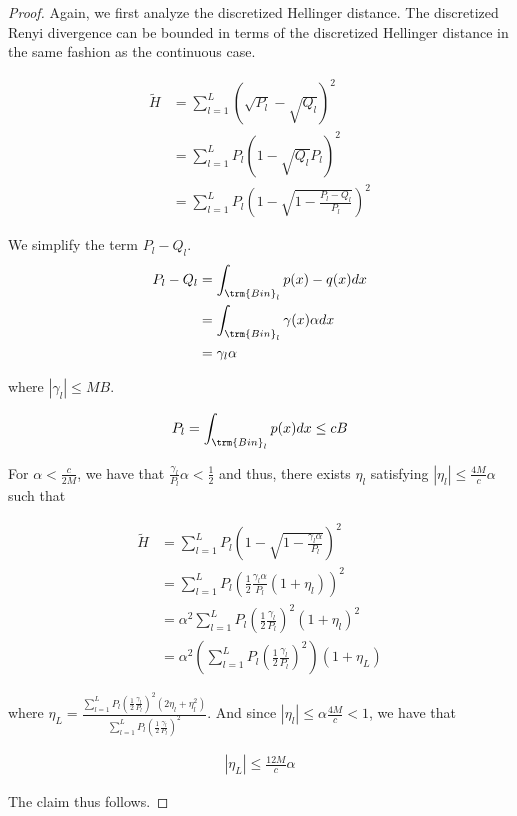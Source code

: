 \documentclass{article}
\begin{document}
\begin{proof}

Again, we first analyze the discretized Hellinger distance. The discretized Renyi divergence can be bounded in terms of the discretized Hellinger distance in the same fashion as the continuous case. 

\begin{align*}
\tilde{H} &= \sum_{l=1}^L (\sqrt{P_l} - \sqrt{Q_l})^2 \\
   &= \sum_{l=1}^L P_l \left( 1 - \sqrt{Q_l}{P_l} \right)^2 \\
 &= \sum_{l=1}^L P_l \left( 1 - \sqrt{1 - \frac{P_l - Q_l}{P_l}} \right)^2 
\end{align*}

We simplify the term $P_l - Q_l$.
\begin{align*}
P_l - Q_l &= \int_{\trm{Bin}_l} p(x) - q(x) dx \\
  &= \int_{\trm{Bin}_l} \gamma(x) \alpha dx \\
  &= \gamma_l \alpha 
\end{align*}

where $|\gamma_l| \leq M B$. 

\[
P_l = \int_{\trm{Bin}_l} p(x) dx \leq c B
\]

For $\alpha < \frac{c}{2M}$, we have that $\frac{\gamma_l}{P_l} \alpha < \frac{1}{2}$ and thus, there exists $\eta_l$ satisfying $|\eta_l| \leq \frac{4M}{c} \alpha$ such that

\begin{align*}
\tilde{H} &= \sum_{l=1}^L P_l \left( 1 - \sqrt{ 1 - \frac{\gamma_l \alpha}{P_l}} \right)^2
\\
&= \sum_{l=1}^L P_l \left( \frac{1}{2} \frac{\gamma_l \alpha}{P_l} (1 + \eta_l) \right)^2 \\
&= \alpha^2 \sum_{l=1}^L P_l \left( \frac{1}{2} \frac{\gamma_l}{P_l} \right)^2 (1 + \eta_l)^2 \\
&= \alpha^2 \left( \sum_{l=1}^L P_l \left( \frac{1}{2} \frac{\gamma_l}{P_l} \right)^2 \right) ( 1 + \eta_L) 
\end{align*}

where $\eta_L = \frac{ 
  \sum_{l=1}^L P_l \left( \frac{1}{2} \frac{\gamma_l}{P_l} \right)^2 (2 \eta_l + \eta_l^2)}
{\sum_{l=1}^L P_l \left( \frac{1}{2} \frac{\gamma_l}{P_l} \right)^2} 
$. And since $|\eta_l| \leq \alpha \frac{4M}{c} < 1$, we have that

\begin{align*}
|\eta_L| \leq \frac{12 M}{c} \alpha
\end{align*}

The claim thus follows. 

\end{proof}
\end{document}
